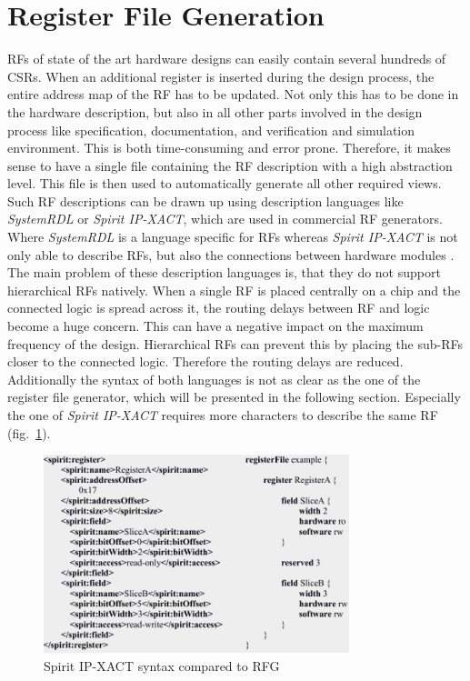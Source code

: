 \section{Register File Generation}\label{rf_generation}
RFs of state of the art hardware designs can easily contain several hundreds of CSRs. When an additional register is inserted during the design process, the entire address map of the RF has to be updated. Not only this has to be done in the hardware description, but also in all other parts involved in the design process like specification, documentation, and verification and simulation environment. This is both time-consuming and error prone. Therefore, it makes sense to have a single file containing the RF description with a high abstraction level. This file is then used to automatically generate all other required views.\\

Such RF descriptions can be drawn up using description languages like \emph{SystemRDL} or \emph{Spirit IP-XACT}, which are used in commercial RF generators. Where \emph{SystemRDL} is a language specific for RFs \cite{system_rdl} whereas \emph{Spirit IP-XACT} is not only able to describe RFs, but also the connections between hardware modules \cite{ip_xact}.\\

The main problem of these description languages is, that they do not support hierarchical RFs natively. When a single RF is placed centrally on a chip and the connected logic is spread across it, the routing delays between RF and logic become a huge concern. This can have a negative impact on the maximum frequency of the design. Hierarchical RFs can prevent this by placing the sub-RFs closer to the connected logic. Therefore the routing delays are reduced.\\
Additionally the syntax of both languages is not as clear as the one of the register file generator, which will be presented in the following section. Especially the one of \emph{Spirit IP-XACT} requires more characters to describe the same RF (fig.~\ref{fig::compare_syntax}).
\begin{figure}[h]
 \centering
 \includegraphics[width=252pt]{images/ip_vs_rfg.png}
 \caption{Spirit IP-XACT syntax compared to RFG \cite{markus_rfg}}
\label{fig::compare_syntax}
\end{figure}
